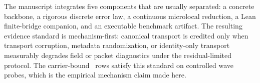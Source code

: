 The manuscript integrates five components that are usually separated: a concrete backbone, a rigorous discrete error law, a continuous microlocal reduction, a Lean finite-bridge companion, and an executable benchmark artifact. The resulting evidence standard is mechanism-first: canonical transport is credited only when transport corruption, metadata randomization, or identity-only transport measurably degrades field or packet diagnostics under the residual-limited protocol. The carrier-bound \MiNO\ rows satisfy this standard on controlled wave probes, which is the empirical mechanism claim made here.
